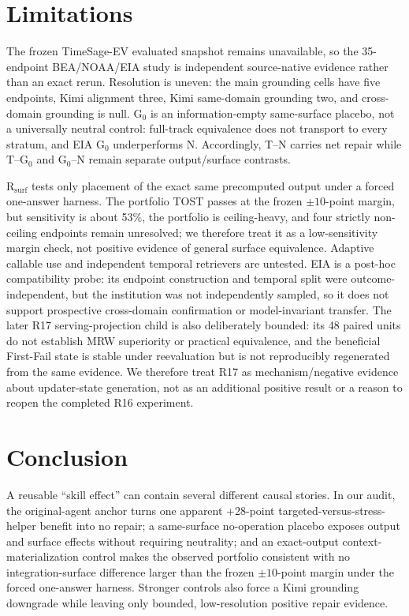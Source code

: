 \section{Limitations}
\label{sec:limitations}
The frozen TimeSage-EV evaluated snapshot remains unavailable, so the 35-endpoint BEA/NOAA/EIA study is independent source-native evidence rather than an exact rerun. Resolution is uneven: the main grounding cells have five endpoints, Kimi alignment three, Kimi same-domain grounding two, and cross-domain grounding is null. G$_0$ is an information-empty same-surface placebo, not a universally neutral control: full-track equivalence does not transport to every stratum, and EIA G$_0$ underperforms N. Accordingly, T--N carries net repair while T--G$_0$ and G$_0$--N remain separate output/surface contrasts.

R$_{\mathrm{surf}}$ tests only placement of the exact same precomputed output under a forced one-answer harness. The portfolio TOST passes at the frozen $\pm10$-point margin, but sensitivity is about 53\%, the portfolio is ceiling-heavy, and four strictly non-ceiling endpoints remain unresolved; we therefore treat it as a low-sensitivity margin check, not positive evidence of general surface equivalence. Adaptive callable use and independent temporal retrievers are untested. EIA is a post-hoc compatibility probe: its endpoint construction and temporal split were outcome-independent, but the institution was not independently sampled, so it does not support prospective cross-domain confirmation or model-invariant transfer. The later R17 serving-projection child is also deliberately bounded: its 48 paired units do not establish MRW superiority or practical equivalence, and the beneficial First-Fail state is stable under reevaluation but is not reproducibly regenerated from the same evidence. We therefore treat R17 as mechanism/negative evidence about updater-state generation, not as an additional positive result or a reason to reopen the completed R16 experiment.

\section{Conclusion}
A reusable ``skill effect'' can contain several different causal stories. In our audit, the original-agent anchor turns one apparent +28-point targeted-versus-stress-helper benefit into no repair; a same-surface no-operation placebo exposes output and surface effects without requiring neutrality; and an exact-output context-materialization control makes the observed portfolio consistent with no integration-surface difference larger than the frozen $\pm10$-point margin under the forced one-answer harness. Stronger controls also force a Kimi grounding downgrade while leaving only bounded, low-resolution positive repair evidence.

